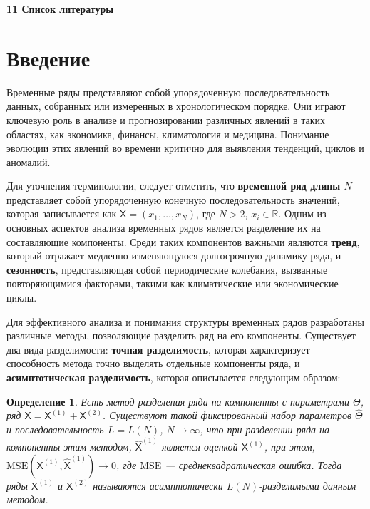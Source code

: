 \documentclass[a4paper, 11pt]{article}
\date{}
\newcommand{\TS}{\mathsf{X}}
\newtheorem{definition}{Определение} %
\begin{document}
%


\tableofcontents
\noindent
\textbf{11\textit{} \space Список литературы}

\newpage

\section{Введение}


Временные ряды представляют собой упорядоченную последовательность данных, собранных или измеренных в хронологическом порядке. Они играют ключевую роль в анализе и прогнозировании различных явлений в таких областях, как экономика, финансы, климатология и медицина. Понимание эволюции этих явлений во времени критично для выявления тенденций, циклов и аномалий.

Для уточнения терминологии, следует отметить, что \textbf{временной ряд длины \( N \)} представляет собой упорядоченную конечную последовательность значений, которая записывается как \( \TS = (x_1, \dots, x_{N}) \), где \( N > 2 \), $x_i \in \mathbb{R}$. Одним из основных аспектов анализа временных рядов является разделение их на составляющие компоненты. Среди таких компонентов важными являются \textbf{тренд}, который отражает медленно изменяющуюся долгосрочную динамику ряда, и \textbf{сезонность}, представляющая собой периодические колебания, вызванные повторяющимися факторами, такими как климатические или экономические циклы.

Для эффективного анализа и понимания структуры временных рядов разработаны различные методы, позволяющие разделить ряд на его компоненты. Существует два вида разделимости: \textbf{точная разделимость}, которая характеризует способность метода точно выделять отдельные компоненты ряда, и \textbf{асимптотическая разделимость}, которая описывается следующим образом:

\begin{definition}
	\label{def:asymp}
	Есть метод разделения ряда на компоненты с параметрами \( \Theta \), ряд \( \TS = \TS^{(1)} + \TS^{(2)} \). Существуют такой фиксированный набор параметров \( \hat{\Theta} \) и последовательность \( L = L(N) \), \( N \rightarrow \infty \), что при разделении ряда на компоненты этим методом, \( \hat{\TS}^{(1)} \) является оценкой \( \TS^{(1)} \), при этом, \( \mathrm{MSE}\left(\TS^{(1)}, \hat{\TS}^{(1)}\right) \rightarrow 0 \), где \( \mathrm{MSE} \) --- среднеквадратическая ошибка. Тогда ряды \( \TS^{(1)} \) и \( \TS^{(2)} \) называются асимптотически \( L(N) \)-разделимыми данным методом.
\end{definition}
\end{document}
